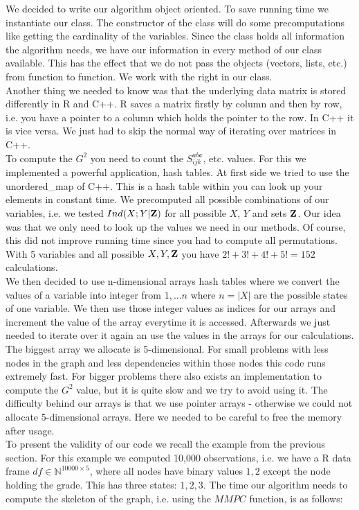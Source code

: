 		We decided to write our algorithm object oriented. To save running time we instantiate our class. The constructor of the class will do some precomputations like getting the cardinality of the variables. Since the class holds all information the algorithm needs, we have our information in every method of our class available. This has the effect that we do not pass the objects (vectors, lists, etc.) from function to function. We work with the right in our class.\\
		Another thing we needed to know was that the underlying data matrix is stored differently in R and C++. R saves a matrix firstly by column and then by row, i.e. you have a pointer to a column which holds the pointer to the row. In C++ it is vice versa. We just had to skip the normal way of iterating over matrices in C++.\\
		To compute the $G^{2}$ you need to count the $S^{ab\textbf{c}}_{ijk}$, etc. values. For this we implemented a powerful application, hash tables. At first side we tried to use the unordered\_map of C++. This is a hash table within you can look up your elements in constant time. We precomputed all possible combinations of our variables, i.e. we tested $Ind(X;Y | {\textbf{Z}})$ for all possible $X$, $Y$ and sets ${\textbf{Z}}$. Our idea was that we only need to look up the values we need in our methods. Of course, this did not improve running time since you had to compute all permutations. With 5 variables and all possible $X, Y, {\textbf{Z}}$ you have $2! + 3! + 4! + 5! = 152$ calculations.\\
		We then decided to use n-dimensional arrays hash tables where we convert the values of a variable into integer from $1,...n$ where $n = |X|$ are the possible states of one variable. We then use those integer values as indices for our arrays and increment the value of the array everytime it is accessed. Afterwards we just needed to iterate over it again an use the values in the arrays for our calculations. The biggest array we allocate is 5-dimensional. For small problems with less nodes in the graph and less dependencies within those nodes this code runs extremely fast. For bigger problems there also exists an implementation to compute the $G^{2}$ value, but it is quite slow and we try to avoid using it. The difficulty behind our arrays is that we use pointer arrays - otherwise we could not allocate 5-dimensional arrays. Here we needed to be careful to free the memory after usage.\\
		To present the validity of our code we recall the example from the previous section. For this example we computed 10,000 observations, i.e. we have a R data frame $df \in \mathbb{N}^{10000 \times 5}$, where all nodes have binary values $1, 2$ except the node holding the grade. This has three states: $1, 2, 3$. The time our algorithm needs to compute the skeleton of the graph, i.e. using the $MMPC$ function, is as follows:

